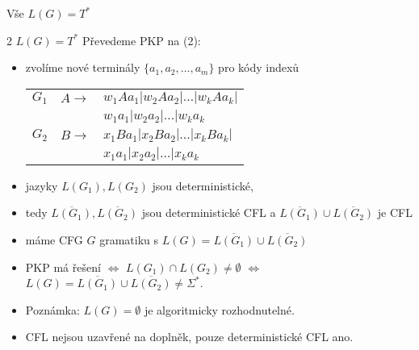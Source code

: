     
    \begin{frame}{Vše $L(G)=T^*$}
    \begin{proofm}{{ 2 $L(G)=T^*$}}
    Převedeme PKP na (2):
    \begin{itemize}[<+->]
        \item zvolíme nové terminály $\{a_1,a_2,\ldots, a_m\}$ pro kódy indexů
    \begin{tabular}{c l l}
    $G_1$ & $A\rightarrow$ & $w_1Aa_1 |w_2Aa_2 |\ldots |w_kAa_k |  $\\
     &  & $w_1a_1 |w_2a_2 |\ldots |w_ka_k  $\\
    $G_2$ & $B\rightarrow$ & $x_1Ba_1 |x_2Ba_2 |\ldots |x_kBa_k |  $\\
     &  & $x_1a_1 |x_2a_2 |\ldots |x_ka_k   $
    \end{tabular}
    \item jazyky $L(G_1), L(G_2)$ jsou deterministické,
    \item tedy $\overline{L(G_1)}, \overline{L(G_2)}$ jsou deterministické CFL a 
    $\overline{L(G_1)}\cup \overline{L(G_2)}$ je CFL
    \item máme CFG $G$ gramatiku s $L(G)=\overline{L(G_1)}\cup \overline{L(G_2)}$
    \item PKP má řešení $\Leftrightarrow$ $L(G_1)\cap L(G_2)\neq \emptyset$ $\Leftrightarrow$ $L(G)=\overline{L(G_1)}\cup \overline{L(G_2)}\neq \Sigma^*$.
    \end{itemize}
    \end{proofm}
    \begin{itemize}
        \item Poznámka: $L(G)=\emptyset$ je algoritmicky rozhodnutelné.
        \item CFL nejsou uzavřené na doplněk, pouze deterministické CFL ano.
    \end{itemize}
    \end{frame}
    
